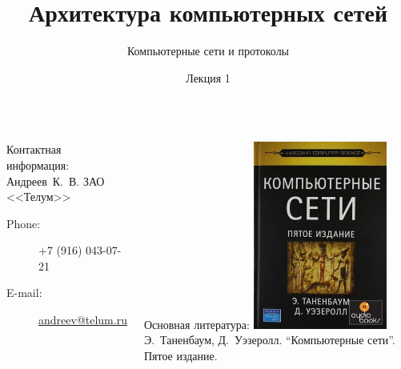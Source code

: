 \documentclass[utf8]{beamer}
\title{Архитектура компьютерных сетей}
\author {Компьютерные сети и протоколы}
\date{Лекция 1}
\begin{document}
\begin{frame}
\titlepage
\end{frame}
\begin{frame}
\begin{columns}
	\begin{block}{Контактная информация:}
	Андреев~К.~В. ЗАО <<Телум>>
	\begin{description}
		\item [Phone:] +7 (916) 043-07-21
		\item [E-mail:] \url{andreev@telum.ru}
	\end{description}
	\end{block}
	\begin{block}{Основная литература:}
	\centering
	\includegraphics[width=0.5\textwidth]{pic/tanenbaum.png}
	\newline
	Э.~Таненбаум, Д.~Уэзеролл. ``Компьютерные сети''.
	\newline
	Пятое издание.
	\end{block}
\end{columns}
\end{frame}
\end{document}
